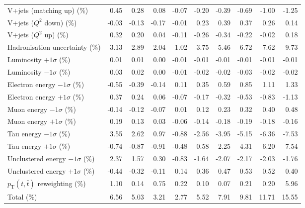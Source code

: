 \begin{table}[htbp]
{\begin{tabular}{lrrrrrrrrr}
V+jets (matching up) (\%) & 0.45 & 0.28 & 0.08 & -0.07 & -0.20 & -0.39 & -0.69 & -1.00 & -1.25 \\ 
V+jets ($Q^{2}$ down) (\%) & -0.03 & -0.13 & -0.17 & -0.01 & 0.23 & 0.39 & 0.37 & 0.26 & 0.14 \\ 
V+jets ($Q^{2}$ up) (\%) & 0.32 & 0.20 & 0.04 & -0.11 & -0.26 & -0.34 & -0.22 & -0.02 & 0.18 \\ 
Hadronisation uncertainty (\%) & 3.13 & 2.89 & 2.04 & 1.02 & 3.75 & 5.46 & 6.72 & 7.62 & 9.73 \\ 
Luminosity $+1\sigma$ (\%) & 0.01 & 0.01 & 0.00 & -0.01 & -0.01 & -0.01 & -0.01 & -0.01 & -0.01 \\ 
Luminosity $-1\sigma$ (\%) & 0.03 & 0.02 & 0.00 & -0.01 & -0.02 & -0.02 & -0.03 & -0.02 & -0.02 \\ 
Electron energy $-1\sigma$ (\%) & -0.55 & -0.39 & -0.14 & 0.11 & 0.35 & 0.59 & 0.85 & 1.11 & 1.33 \\ 
Electron energy $+1\sigma$ (\%) & 0.37 & 0.24 & 0.06 & -0.07 & -0.17 & -0.32 & -0.53 & -0.83 & -1.13 \\ 
Muon energy $-1\sigma$ (\%) & -0.14 & -0.12 & -0.07 & 0.01 & 0.12 & 0.23 & 0.32 & 0.40 & 0.48 \\ 
Muon energy $+1\sigma$ (\%) & 0.19 & 0.13 & 0.03 & -0.06 & -0.14 & -0.18 & -0.19 & -0.18 & -0.16 \\ 
Tau energy $-1\sigma$ (\%) & 3.55 & 2.62 & 0.97 & -0.88 & -2.56 & -3.95 & -5.15 & -6.36 & -7.53 \\ 
Tau energy $+1\sigma$ (\%) & -0.74 & -0.87 & -0.91 & -0.48 & 0.58 & 2.25 & 4.31 & 6.20 & 7.54 \\ 
Unclustered energy $-1\sigma$ (\%) & 2.37 & 1.57 & 0.30 & -0.83 & -1.64 & -2.07 & -2.17 & -2.03 & -1.76 \\ 
Unclustered energy $+1\sigma$ (\%) & -0.44 & -0.32 & -0.11 & 0.14 & 0.36 & 0.47 & 0.53 & 0.52 & 0.40 \\ 
$p_\mathrm{T}(t,\bar{t})$ reweighting (\%) & 1.10 & 0.14 & 0.75 & 0.22 & 0.10 & 0.07 & 0.21 & 0.20 & 5.96 \\ 
\hline 
Total (\%) & 6.56  & 5.03  & 3.21  & 2.77  & 5.52  & 7.91  & 9.81  & 11.71  & 15.55 \\ 
\hline 
\end{tabular}
}
\end{table}
